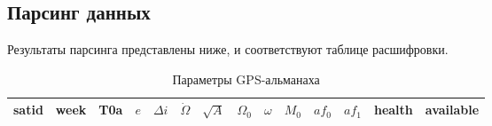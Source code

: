 \documentclass[a4paper, 14pt]{article}
\begin{document}
\subsection{Парсинг данных}

Результаты парсинга представлены ниже, и соответствуют таблице расшифровки.

\begin{landscape}

  \small
  \setlength{\LTleft}{0pt}
  \setlength{\LTright}{0pt}

  \begin{longtable}{|c|c|c|c|c|c|c|c|c|c|c|c|c|c|}
    \caption{Параметры GPS-альманаха}
    \label{tab:gps_almanac} \\
    \hline

    satid & week & T0a & $e$ & $\Delta i$ & $\dot{\Omega}$ & $\sqrt{A}$ & $\Omega_0$ & $\omega$ & $M_0$ & $af_0$ & $af_1$ & health & available \\ \hline


\end{longtable}
\end{landscape}
\end{document}
